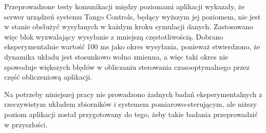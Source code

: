 Przeprowadzone testy komunikacji między poziomami aplikacji wykazały, że serwer urządzeń systemu Tango Controls, będący wyższym jej poziomem, nie jest w stanie obsłużyć wysyłanych w każdym kroku symulacji danych. Zastosowano więc blok wyzwalający wysyłanie z mniejszą częstotliwością. Dobrano eksperymentalnie wartość 100 ms jako okres wysyłania, ponieważ stwierdzono, że dynamika układu jest stosunkowo wolno zmienna, a więc taki okres nie spowoduje większych błędów w obliczaniu sterowania czasooptymalnego przez część obliczeniową aplikacji.

Na potrzeby niniejszej pracy nie prowadzono żadnych badań eksperymentalnych z rzeczywistym układem zbiorników i systemem pomiarowo-sterującym, ale niższy poziom aplikacji został przygotowany do tego, żeby takie badania przeprowadzić w przyszłości.